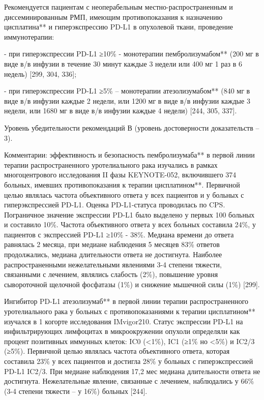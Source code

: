 Рекомендуется пациентам с неоперабельным местно-распространенным и диссеминированным РМП, имеющим противопоказания к назначению цисплатина** и гиперэкспрессию PD-L1 в опухолевой ткани, проведение иммунотерапии:

- при гиперэкспрессии PD-L1 ≥10\% - монотерапии пембролизумабом** (200 мг в виде в/в инфузии в течение 30 минут каждые 3 недели или 400 мг 1 раз в 6 недель) [299, 304, 336];

- при гиперэкспрессии PD-L1 ≥5\% – монотерапии атезолизумабом** (840 мг в виде в/в инфузии каждые 2 недели, или 1200 мг в виде в/в инфузии каждые 3 недели, или 1680 мг в виде в/в инфузии каждые 4 недели) [244, 305, 337].

Уровень убедительности рекомендаций В (уровень достоверности доказательств – 3).

Комментарии: эффективность и безопасность пембролизумаба** в первой линии терапии распространенного уротелиального рака изучались в рамках многоцентрового исследования II фазы KEYNOTE-052, включившего 374 больных, имевших противопоказания к терапии цисплатином**. Первичной целью являлась частота объективного ответа у всех пациентов и у больных с гиперэкспрессией PD-L1. Оценка PD-L1-статуса проводилась по CPS. Пограничное значение экспрессии PD-L1 было выделено у первых 100 больных и составило 10\%. Частота объективного ответа у всех больных составила 24\%, у пациентов с экспрессией PD-L1 ≥10\% - 38\%. Медиана времени до ответа равнялась 2 месяца, при медиане наблюдения 5 месяцев 83\% ответов продолжались, медиана длительности ответа не достигнута. Наиболее распространенными нежелательными явлениями 3-4 степени тяжести, связанными с лечением, являлись слабость (2\%), повышение уровня сывороточной щелочной фосфатазы (1\%) и снижение мышечной силы (1\%) [299].

Ингибитор PD-L1 атезолизумаб** в первой линии терапии распространенного уротелиального рака у больных с противопоказаниями к терапии цисплатином** изучался в 1 когорте исследования IMvigor210. Статус экспрессии PD-L1 на инфильтрирующих лимфоцитах в микроокружении опухоли определяли как процент позитивных иммунных клеток: IC0 (<1\%), IC1 (≥1\% но <5\%) и IC2/3 (≥5\%). Первичной целью являлась частота объективного ответа, которая составила 23\% у всех пациентов и достигла 28\% у больных с гиперэкспрессией PD-L1 IC2/3. При медиане наблюдения 17,2 мес медиана длительности ответа не достигнута. Нежелательные явление, связанные с лечением, наблюдались у 66\% (3-4 степени тяжести – у 16\%) больных [244].

